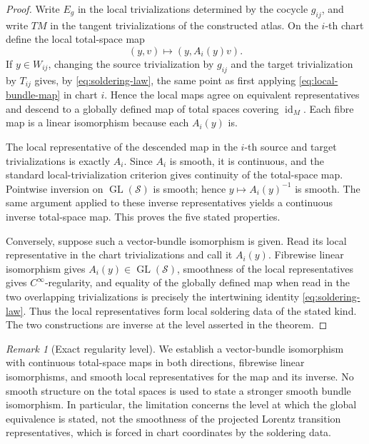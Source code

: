 \documentclass[11pt,a4paper]{article}
\theoremstyle{definition}
\theoremstyle{remark}
\newtheorem{remark}[theorem]{Remark}
\newcommand{\Smodel}{\mathcal{S}}
\newcommand{\GL}{\operatorname{GL}}
\newcommand{\id}{\operatorname{id}}
\begin{document}
\begin{proof}
Write \(E_g\) in the local trivializations determined by
the cocycle \(g_{ij}\), and write \(TM\) in the tangent trivializations of
the constructed atlas.  On the \(i\)-th chart define the local total-space
map
\[
   (y,v)\longmapsto (y,A_i(y)v).
\tag{7.4a}\label{eq:local-bundle-map}
\]
If \(y\in W_{ij}\), changing the source trivialization by \(g_{ij}\) and
the target trivialization by \(T_{ij}\) gives, by
\eqref{eq:soldering-law}, the same point as first applying
\eqref{eq:local-bundle-map} in chart \(i\).  Hence the local maps agree on
equivalent representatives and descend to a globally defined map of total
spaces covering \(\id_M\).  Each fibre map is a linear isomorphism because
each \(A_i(y)\) is.

The local representative of the descended map in the \(i\)-th source and
target trivializations is exactly \(A_i\).  Since \(A_i\) is smooth, it is
continuous, and the standard local-trivialization criterion gives
continuity of the total-space map.  Pointwise inversion on
\(\GL(\Smodel)\) is smooth; hence \(y\mapsto A_i(y)^{-1}\) is smooth.  The
same argument applied to these inverse representatives yields a continuous
inverse total-space map.  This proves the five stated properties.

Conversely, suppose such a vector-bundle isomorphism is given.  Read
its local representative in the chart trivializations and call it
\(A_i(y)\).  Fibrewise linear isomorphism gives
\(A_i(y)\in\GL(\Smodel)\), smoothness of the local representatives gives \(C^\infty\)-regularity,
and equality of the globally defined map when read in the two overlapping
trivializations is precisely the intertwining identity
\eqref{eq:soldering-law}.  Thus the local representatives form local soldering data of the stated kind.  The two constructions are inverse at the level asserted
in the theorem.
\end{proof}

\begin{remark}[Exact regularity level]
We establish a vector-bundle isomorphism with continuous total-space maps in both
directions, fibrewise linear isomorphisms, and smooth local representatives
for the map and its inverse.  No smooth structure on the total spaces is used to state a stronger smooth bundle isomorphism.  In particular, the limitation concerns the level at which the
global equivalence is stated, not the smoothness of the projected Lorentz
transition representatives, which is forced in chart coordinates by the soldering data.
\end{remark}
\end{document}
